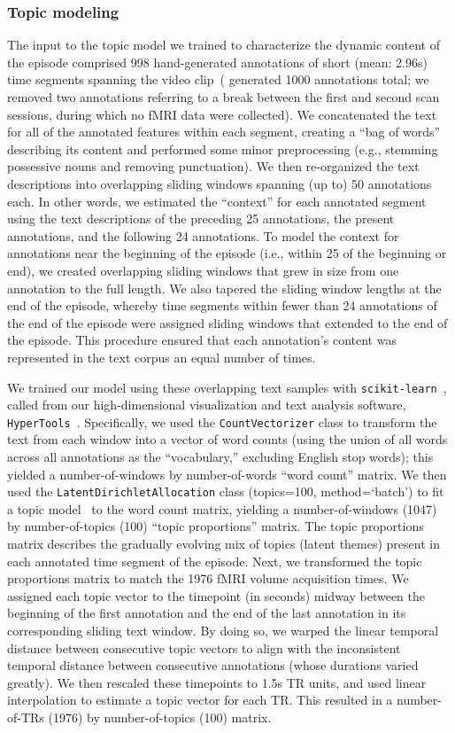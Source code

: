 \documentclass[10pt]{article}
\begin{document}
\subsubsection*{Topic modeling}
The input to the topic model we trained to characterize the dynamic content of the episode comprised 998 hand-generated annotations of short (mean: 2.96s) time segments spanning the video clip~(\citealp{ChenEtal17} generated 1000 annotations total; we removed two annotations referring to a break between the first and second scan sessions, during which no fMRI data were collected).  We concatenated the text for all of the annotated features within each segment, creating a ``bag of words'' describing its content and performed some minor preprocessing (e.g., stemming possessive nouns and removing punctuation).  We then re-organized the text descriptions into overlapping sliding windows spanning (up to) 50 annotations each.  In other words, we estimated the ``context'' for each annotated segment using the text descriptions of the preceding 25 annotations, the present annotations, and the following 24 annotations.  To model the context for annotations near the beginning of the episode (i.e., within 25 of the beginning or end), we created overlapping sliding windows that grew in size from one annotation to the full length.  We also tapered the sliding window lengths at the end of the episode, whereby time segments within fewer than 24 annotations of the end of the episode were assigned sliding windows that extended to the end of the episode.  This procedure ensured that each annotation's content was represented in the text corpus an equal number of times.

We trained our model using these overlapping text samples with \texttt{scikit-learn}~\citep[version 0.19.1; ][]{PedrEtal11}, called from our high-dimensional visualization and text analysis software, \texttt{HyperTools}~\citep{HeusEtal18a}.  Specifically, we used the \texttt{CountVectorizer} class to transform the text from each window into a vector of word counts (using the union of all words across all annotations as the ``vocabulary,'' excluding English stop words); this yielded a number-of-windows by number-of-words ``word count'' matrix.  We then used the \texttt{LatentDirichletAllocation} class (topics=100, method=`batch') to fit a topic model~\citep{BleiEtal03} to the word count matrix, yielding a number-of-windows (1047) by number-of-topics (100) ``topic proportions'' matrix.  The topic proportions matrix describes the gradually evolving mix of topics (latent themes) present in each annotated time segment of the episode.  Next, we transformed the topic proportions matrix to match the 1976 fMRI volume acquisition times.  We assigned each topic vector to the timepoint (in seconds) midway between the beginning of the first annotation and the end of the last annotation in its corresponding sliding text window.  By doing so, we warped the linear temporal distance between consecutive topic vectors to align with the inconsistent temporal distance between consecutive annotations (whose durations varied greatly).  We then rescaled these timepoints to 1.5s TR units, and used linear interpolation to estimate a topic vector for each TR.  This resulted in a number-of-TRs (1976) by number-of-topics (100) matrix.
\end{document}

